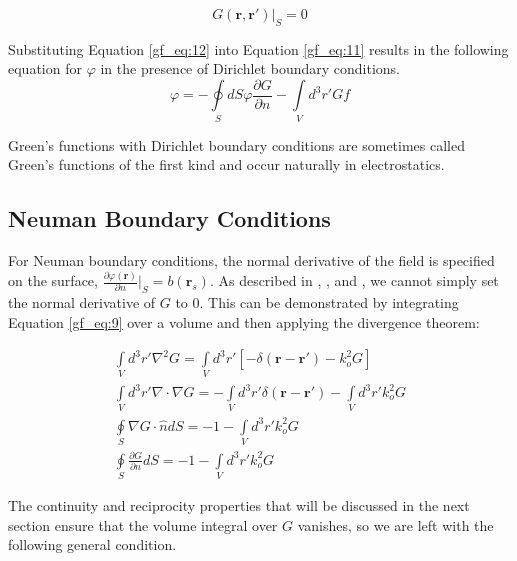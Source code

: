 \begin{equation}
G\left(\mathbf{r},\mathbf{r}' \right)\bigg|_{S}=0
\label{gf_eq:12}
\end{equation}
\renewcommand{\baselinestretch}{2} \small\normalsize

Substituting Equation \ref{gf_eq:12} into Equation \ref{gf_eq:11} results in the following equation for $\varphi$ in the presence of Dirichlet boundary conditions.
\begin{equation}
\boxed{\varphi = -\oint\limits_{S}dS \varphi\frac{\partial G}{\partial n} -\int\limits_{V}d^3r' Gf}
\label{gf_eq:13}
\end{equation}
\renewcommand{\baselinestretch}{2} \small\normalsize

Green's functions with Dirichlet boundary conditions are sometimes called Green's functions of the first kind and occur naturally in electrostatics. 

\subsection {Neuman Boundary Conditions}
For Neuman boundary conditions, the normal derivative of the field is specified on the surface, $\frac{\partial\varphi\left(\mathbf{r}\right)}{\partial n}|_{S} = b\left(\mathbf{r}_s\right)$. As described in \cite{jackson_classical_em}, \cite{zangwill_modern_em}, and \cite{balanis_advanced}, we cannot simply set the normal derivative of $G$ to $0$. This can be demonstrated by integrating Equation \ref{gf_eq:9} over a volume and then applying the divergence theorem:

\begin{equation}
\begin{gathered}
\int\limits_{V}d^3r' \nabla^2 G = \int\limits_{V}d^3r'\left[-\delta\left(\mathbf{r}-\mathbf{r}' \right) -k_o^2G \right] \\
\int\limits_{V}d^3r' \nabla \cdot \nabla G = -\int\limits_{V}d^3r'\delta\left(\mathbf{r}-\mathbf{r}' \right) -\int\limits_{V}d^3r'k_o^2G \\
\oint\limits_{S}\nabla G \cdot \hat{n} dS  = -1 - \int\limits_{V}d^3r'k_o^2G\\
\oint\limits_{S}\frac{\partial G}{\partial n} dS = -1 - \int\limits_{V}d^3r' k_o^2G
\end{gathered}
\label{gf_eq:14}
\end{equation}
\renewcommand{\baselinestretch}{2} \small\normalsize

The continuity and reciprocity properties that will be discussed in the next section ensure that the volume integral over $G$ vanishes, so we are left with the following general condition.

